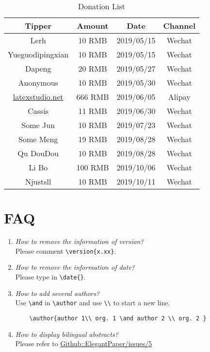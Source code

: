 \documentclass[11pt,en,authoryear]{elegantpaper}
\begin{document}
\begin{table}[htbp]
	\centering
	\caption{Donation List}
	\begin{tabular}{cccc}
		\toprule
		Tipper   & Amount & Date & Channel \\
		\midrule
		Lerh  & 10 RMB  & 2019/05/15 & Wechat \\
		Yueguodipingxian & 10 RMB   & 2019/05/15 & Wechat \\
		Dapeng & 20 RMB & 2019/05/27 & Wechat\\
		Anonymous & 10 RMB & 2019/05/30 & Wechat \\
		\href{http://www.latexstudio.net/}{latexstudio.net} & 666 RMB & 2019/06/05 & Alipay \\
		Cassis & 11 RMB & 2019/06/30 & Wechat \\
		Some Jun & 10 RMB & 2019/07/23 & Wechat \\
		Some Meng & 19 RMB & 2019/08/28 & Wechat \\
		Qu DouDou & 10 RMB & 2019/08/28 & Wechat \\
		Li Bo & 100 RMB & 2019/10/06 & Wechat\\
		Njustsll & 10 RMB & 2019/10/11 & Wechat \\
		\bottomrule
	\end{tabular}%
\end{table}%

\section{FAQ}

\begin{enumerate}[label=\arabic*).]
	\item \textit{How to remove the information of version?}\\
    Please comment \lstinline|\version{x.xx}|.
	\item \textit{How to remove the information of date?}\\
	Please type in \lstinline|\date{}|.
	\item \textit{How to add several authors?}\\
	Use \lstinline{\and} in \lstinline{\author} and use \lstinline{\\} to start a new line.
	\begin{lstlisting}
	\author{author 1\\ org. 1 \and author 2 \\ org. 2 }
	\end{lstlisting}
	\item \textit{How to display bilingual abstracts?}\\
	Please refer to \href{https://github.com/ElegantLaTeX/ElegantPaper/issues/5}{Github::ElegantPaper/issues/5}
\end{enumerate}
\end{document}
